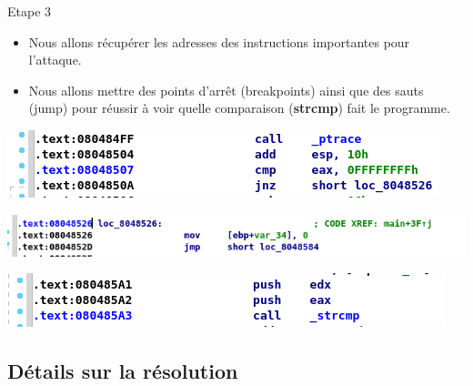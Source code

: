\documentclass{beamer}
\begin{document}
\begin{frame}
\begin{block}{Etape 3}
\begin{itemize}
\item Nous allons récupérer les adresses des instructions importantes pour l'attaque. 
\item Nous allons mettre des points d'arrêt (breakpoints) ainsi que des sauts (jump) pour réussir à voir quelle comparaison (\textbf{strcmp}) fait le programme.
\end{itemize}
\end{block}
\begin{center}
\includegraphics[scale=0.5]{./pictures/113-reversing-2-ida-5.PNG}
\end{center}
\bigskip
\begin{center}
\includegraphics[scale=0.5]{./pictures/113-reversing-2-ida-6.PNG}
\end{center}
\bigskip
\begin{center}
\includegraphics[scale=0.5]{./pictures/113-reversing-2-ida-7.PNG}
\end{center}
\end{frame}

\subsection{Détails sur la résolution}
\end{document}
